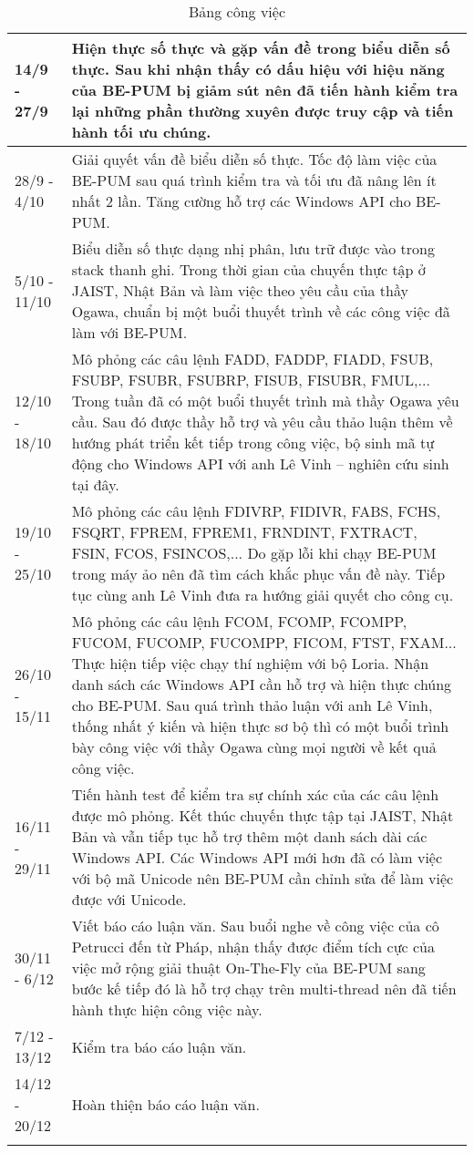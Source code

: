 \begin{longtable}{|l|m{13cm}|}
		\hline	
			14/9 - 27/9	& Hiện thực số thực và gặp vấn đề trong biểu diễn số thực. Sau khi nhận thấy có dấu hiệu với hiệu năng của BE-PUM bị giảm sút nên đã tiến hành kiểm tra lại những phần thường xuyên được truy cập và tiến hành tối ưu chúng.\\
		\hline	
			28/9 - 4/10&	Giải quyết vấn đề biểu diễn số thực. Tốc độ làm việc của BE-PUM sau quá trình kiểm tra và tối ưu đã nâng lên ít nhất 2 lần. Tăng cường hỗ trợ các Windows API cho BE-PUM.\\
		\hline	
			5/10 - 11/10&	Biểu diễn số thực dạng nhị phân, lưu trữ được vào trong stack thanh ghi. Trong thời gian của chuyến thực tập ở JAIST, Nhật Bản và làm việc theo yêu cầu của thầy Ogawa, chuẩn bị một buổi thuyết trình về các công việc đã làm với BE-PUM.\\
		\hline	
			12/10 - 18/10&	Mô phỏng các câu lệnh FADD, FADDP, FIADD, FSUB, FSUBP, FSUBR, FSUBRP, FISUB, FISUBR, FMUL,... Trong tuần đã có một buổi thuyết trình mà thầy Ogawa yêu cầu. Sau đó được thầy hỗ trợ và yêu cầu thảo luận thêm về hướng phát triển kết tiếp trong công việc, bộ sinh mã tự động cho Windows API với anh Lê Vinh -- nghiên cứu sinh tại đây.\\
		\hline	
			19/10 - 25/10&	Mô phỏng các câu lệnh  FDIVRP, FIDIVR, FABS, FCHS, FSQRT, FPREM, FPREM1, FRNDINT, FXTRACT, FSIN, FCOS, FSINCOS,... Do gặp lỗi khi chạy BE-PUM trong máy ảo nên đã tìm cách khắc phục vấn đề này. Tiếp tục cùng anh Lê Vinh đưa ra hướng giải quyết cho công cụ.\\
		\hline
			26/10 - 15/11	& Mô phỏng các câu lệnh FCOM, FCOMP, FCOMPP, FUCOM, FUCOMP, FUCOMPP, FICOM,  FTST, FXAM... Thực hiện tiếp việc chạy thí nghiệm với bộ Loria. Nhận danh sách các Windows API cần hỗ trợ và hiện thực chúng cho BE-PUM. Sau quá trình thảo luận với anh Lê Vinh, thống nhất ý kiến và hiện thực sơ bộ thì có một buổi trình bày công việc với thầy Ogawa cùng mọi người về kết quả công việc.\\		
		\hline	
			16/11 - 29/11&	Tiến hành test để kiểm tra sự chính xác của các câu lệnh được mô phỏng. Kết thúc chuyến thực tập tại JAIST, Nhật Bản và vẫn tiếp tục hỗ trợ thêm một danh sách dài các Windows API. Các Windows API mới hơn đã có làm việc với bộ mã Unicode nên BE-PUM cần chỉnh sửa để làm việc được với Unicode.\\
		\hline	
			30/11 - 6/12	& Viết báo cáo luận văn. Sau buổi nghe về công việc của cô Petrucci đến từ Pháp, nhận thấy được điểm tích cực của việc mở rộng giải thuật On-The-Fly của BE-PUM sang bước kế tiếp đó là hỗ trợ chạy trên multi-thread nên đã tiến hành thực hiện công việc này.\\
		\hline	
			7/12 - 13/12	& Kiểm tra báo cáo luận văn.\\
		\hline	
			14/12 - 20/12&	Hoàn thiện báo cáo luận văn.\\
		\hline
			\caption{Bảng công việc}			
			
	\end{longtable}